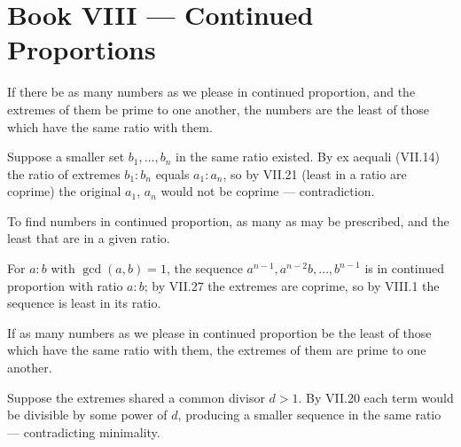 %
%

\section{Book VIII --- Continued Proportions}
\label{sec:book-VIII}

\begin{claim}
\label{prop:VIII.1}
If there be as many numbers as we please in continued proportion, and
the extremes of them be prime to one another, the numbers are the
least of those which have the same ratio with them.
\end{claim}
\begin{evidence}
\label{ev:VIII.1}
Suppose a smaller set $b_1, \dots, b_n$ in the same ratio existed.
By ex aequali (VII.14) the ratio of extremes $b_1 : b_n$ equals $a_1
: a_n$, so by VII.21 (least in a ratio are coprime) the original
$a_1$, $a_n$ would not be coprime --- contradiction.
\end{evidence}

\begin{claim}
\label{prop:VIII.2}
To find numbers in continued proportion, as many as may be prescribed,
and the least that are in a given ratio.
\end{claim}
\begin{evidence}
\label{ev:VIII.2}
For $a : b$ with $\gcd(a, b) = 1$, the sequence $a^{n-1}, a^{n-2}
b, \dots, b^{n-1}$ is in continued proportion with ratio $a : b$; by
VII.27 the extremes are coprime, so by VIII.1 the sequence is least
in its ratio.
\end{evidence}

\begin{claim}
\label{prop:VIII.3}
If as many numbers as we please in continued proportion be the least
of those which have the same ratio with them, the extremes of them
are prime to one another.
\end{claim}
\begin{evidence}
\label{ev:VIII.3}
Suppose the extremes shared a common divisor $d > 1$.  By VII.20
each term would be divisible by some power of $d$, producing a
smaller sequence in the same ratio --- contradicting minimality.
\end{evidence}

